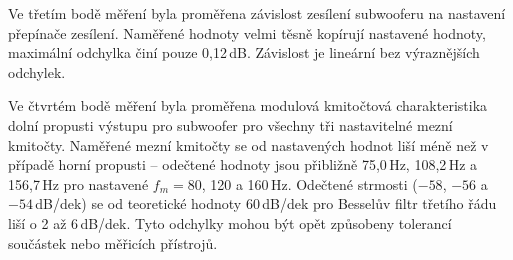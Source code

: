 \documentclass[a4paper, czech]{article}
\begin{document}
Ve třetím bodě měření byla proměřena závislost zesílení subwooferu na nastavení přepínače zesílení.
Naměřené hodnoty velmi těsně kopírují nastavené hodnoty, maximální odchylka činí pouze 0{,}12\,dB.
Závislost je lineární bez výraznějších odchylek.

Ve čtvrtém bodě měření byla proměřena modulová kmitočtová charakteristika dolní propusti výstupu pro subwoofer pro všechny tři nastavitelné mezní kmitočty.
Naměřené mezní kmitočty se od nastavených hodnot liší méně než v případě horní propusti -- odečtené hodnoty jsou přibližně 75{,}0\,Hz, 108{,}2\,Hz a 156{,}7\,Hz pro nastavené $f_m = 80$, 120 a 160\,Hz.
Odečtené strmosti ($-58$, $-56$ a $-54$\,dB/dek) se od teoretické hodnoty 60\,dB/dek pro Besselův filtr třetího řádu liší o 2 až 6\,dB/dek.
Tyto odchylky mohou být opět způsobeny tolerancí součástek nebo měřicích přístrojů.
\end{document}
